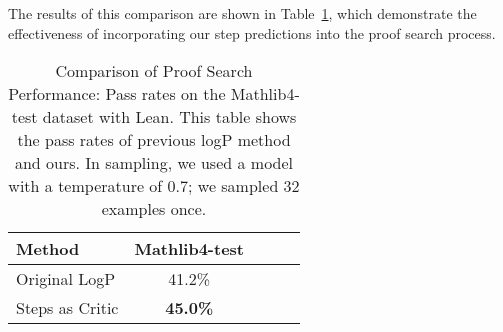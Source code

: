 The results of this comparison are shown in Table~\ref{tab:search_results}, which demonstrate the effectiveness of incorporating our step predictions into the proof search process. 

\begin{table}[h]
    \centering
    \begin{tabular}{lcccc}
        \toprule
        \textbf{Method} & \textbf{Mathlib4-test} \\
        \midrule
        Original LogP  & 41.2\% \\
        Steps as Critic  & \textbf{45.0\%} \\
        \bottomrule
    \end{tabular}
    \caption{Comparison of Proof Search Performance: Pass rates on the Mathlib4-test dataset with Lean. This table shows the pass rates of
previous logP method and ours. In
sampling, we used a model with a temperature of 0.7; we sampled 32 examples once.
}
    \label{tab:search_results}
\end{table}
